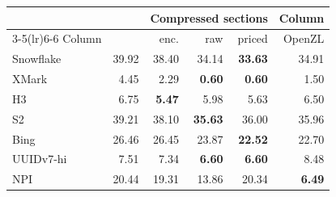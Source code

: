 \begin{tabular}{lrrrrr}
\toprule
 & & \multicolumn{3}{c}{Compressed sections} & \multicolumn{1}{c}{Column} \\
\cmidrule(lr){3-5}\cmidrule(lr){6-6}
Column & \SIS{} & enc. & raw & priced & OpenZL \\
\midrule
Snowflake    & 39.92 & 38.40 & 34.14 & \textbf{33.63} & 34.91 \\
XMark        &  4.45 &  2.29 & \textbf{0.60} & \textbf{0.60} &  1.50 \\
H3           &  6.75 & \textbf{5.47} &  5.98 &  5.63 &  6.50 \\
S2           & 39.21 & 38.10 & \textbf{35.63} & 36.00 & 35.96 \\
Bing         & 26.46 & 26.45 & 23.87 & \textbf{22.52} & 22.70 \\
UUIDv7-hi    &  7.51 &  7.34 & \textbf{6.60} & \textbf{6.60} &  8.48 \\
\midrule
NPI          & 20.44 & 19.31 & 13.86 & 20.34 & \textbf{6.49} \\
\bottomrule
\end{tabular}
